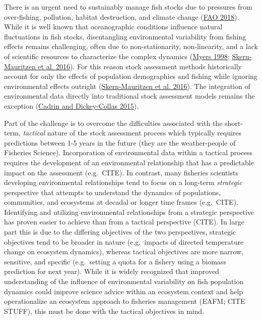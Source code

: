 \documentclass[
]{article}
\begin{document}
There is an urgent need to sustainably manage fish stocks due to pressures from over-fishing, pollution, habitat destruction, and climate change (\protect\hyperlink{ref-faoStateWorldFisheries2018}{FAO 2018}). While it is well known that oceanographic conditions influence natural fluctuations in fish stocks, disentangling environmental variability from fishing effects remains challenging, often due to non-stationarity, non-linearity, and a lack of scientific resources to characterize the complex dynamics (\protect\hyperlink{ref-myersWhenEnvironmentRecruitment1998}{Myers 1998}; \protect\hyperlink{ref-skern-mauritzenEcosystemProcessesAre2016}{Skern‐Mauritzen et al. 2016}). For this reason stock assessment methods historically account for only the effects of population demographics and fishing while ignoring environmental effects outright (\protect\hyperlink{ref-skern-mauritzenEcosystemProcessesAre2016}{Skern‐Mauritzen et al. 2016}). The integration of environmental data directly into traditional stock assessment models remains the exception (\protect\hyperlink{ref-cadrinStockAssessmentMethods2015}{Cadrin and Dickey-Collas 2015}).

Part of the challenge is to overcome the difficulties associated with the short-term, \emph{tactical} nature of the stock assessment process which typically requires predictions between 1-5 years in the future (they are the weather-people of Fisheries Science). Incorporation of environmental data within a tactical process requires the development of an environmental relationship that has a predictable impact on the assessment (e.g.~CITE). In contrast, many fisheries scientists developing environmental relationships tend to focus on a long-term \emph{strategic} perspective that attempts to understand the dynamics of populations, communities, and ecosystems at decadal or longer time frames (e.g.~CITE). Identifying and utilizing environmental relationships from a strategic perspective has proven easier to achieve than from a tactical perspective (CITE). In large part this is due to the differing objectives of the two perspectives, strategic objectives tend to be broader in nature (e.g.~impacts of directed temperature change on ecosystem dynamics), whereas tactical objectives are more narrow, sensitive, and specific (e.g.~setting a quota for a fishery using a biomass prediction for next year). While it is widely recognized that improved understanding of the influence of environmental variability on fish population dynamics could improve science advice within an ecosystem context and help operationalize an ecosystem approach to fisheries management (EAFM; CITE STUFF), this must be done with the tactical objectives in mind.
\end{document}

